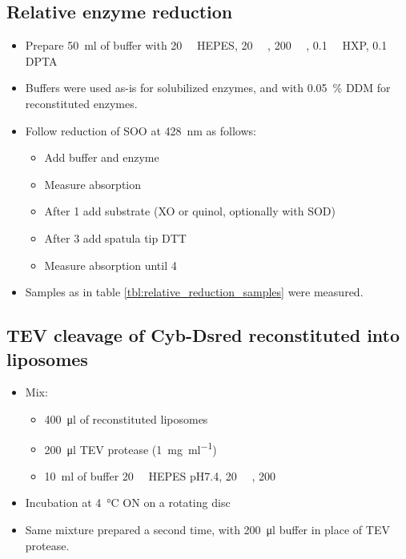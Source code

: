 \subsection{Relative enzyme reduction}

\begin{itemize}
	\item Prepare \SI{50}{\ml} of buffer with \SI{20}{\milli\Molar} HEPES,
		\SI{20}{\milli\Molar} , \SI{200}{\milli\Molar}
		, \SI{0.1}{\milli\Molar} HXP, \SI{0.1}{\milli\Molar}
		DPTA
	\item Buffers were used as-is for solubilized enzymes, and with \SI{0.05}{\percent} DDM for reconstituted enzymes.
	\item Follow reduction of SOO at \SI{428}{\nm} as follows:
		\begin{itemize}
			\item Add buffer and enzyme
			\item Measure absorption
			\item After \SI{1}{\min} add substrate (XO or quinol, optionally with SOD)
			\item After \SI{3}{\min} add spatula tip DTT
			\item Measure absorption until \SI{4}{\min}
		\end{itemize}
	\item Samples as in table \ref{tbl:relative_reduction_samples} were measured.
\end{itemize}

\subsection{TEV cleavage of Cyb-Dsred reconstituted into liposomes}

\begin{itemize}
	\item Mix:
		\begin{itemize}
			\item \SI{400}{\ul} of reconstituted liposomes 
			\item \SI{200}{\ul} TEV protease (\SI{1}{\mg\per\ml})
			\item \SI{10}{\ml} of buffer \SI{20}{\milli\Molar}
				HEPES pH7.4, \SI{20}{\milli\Molar} ,
				\SI{200}{\milli\Molar} 
		\end{itemize}
	\item Incubation at \SI{4}{\celsius} ON on a rotating disc
	\item Same mixture prepared a second time, with \SI{200}{\ul} buffer in
		place of TEV protease.
\end{itemize}

